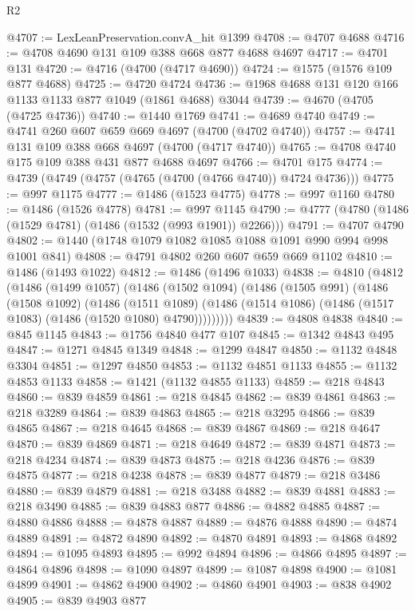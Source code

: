 \begin{lexlean}{R2}
\begin{coremodule}
@4707 := LexLeanPreservation.convA_hit @1399
@4708 := @4707 @4688
@4716 := @4708 @4690 @131 @109 @388 @668 @877 @4688 @4697
@4717 := @4701 @131
@4720 := @4716 (@4700 (@4717 @4690))
@4724 := @1575 (@1576 @109 @877 @4688)
@4725 := @4720 @4724
@4736 := @1968 @4688 @131 @120 @166 @1133 @1133 @877 @1049 (@1861 @4688) @3044
@4739 := @4670 (@4705 (@4725 @4736))
@4740 := @1440 @1769
@4741 := @4689 @4740
@4749 := @4741 @260 @607 @659 @669 @4697 (@4700 (@4702 @4740))
@4757 := @4741 @131 @109 @388 @668 @4697 (@4700 (@4717 @4740))
@4765 := @4708 @4740 @175 @109 @388 @431 @877 @4688 @4697
@4766 := @4701 @175
@4774 := @4739 (@4749 (@4757 (@4765 (@4700 (@4766 @4740)) @4724 @4736)))
@4775 := @997 @1175
@4777 := @1486 (@1523 @4775)
@4778 := @997 @1160
@4780 := @1486 (@1526 @4778)
@4781 := @997 @1145
@4790 := @4777 (@4780 (@1486 (@1529 @4781) (@1486 (@1532 (@993 @1901)) @2266)))
@4791 := @4707 @4790
@4802 := @1440 (@1748 @1079 @1082 @1085 @1088 @1091 @990 @994 @998 @1001 @841)
@4808 := @4791 @4802 @260 @607 @659 @669 @1102
@4810 := @1486 (@1493 @1022)
@4812 := @1486 (@1496 @1033)
@4838 := @4810
    (@4812
      (@1486
        (@1499 @1057)
        (@1486
          (@1502 @1094)
          (@1486
            (@1505 @991)
            (@1486
              (@1508 @1092)
              (@1486
                (@1511 @1089)
                (@1486 (@1514 @1086) (@1486 (@1517 @1083) (@1486 (@1520 @1080) @4790)))))))))
@4839 := @4808 @4838
@4840 := @845 @1145
@4843 := @1756 @4840 @477 @107
@4845 := @1342 @4843 @495
@4847 := @1271 @4845 @1349
@4848 := @1299 @4847
@4850 := @1132 @4848 @3304
@4851 := @1297 @4850
@4853 := @1132 @4851 @1133
@4855 := @1132 @4853 @1133
@4858 := @1421 (@1132 @4855 @1133)
@4859 := @218 @4843
@4860 := @839 @4859
@4861 := @218 @4845
@4862 := @839 @4861
@4863 := @218 @3289
@4864 := @839 @4863
@4865 := @218 @3295
@4866 := @839 @4865
@4867 := @218 @4645
@4868 := @839 @4867
@4869 := @218 @4647
@4870 := @839 @4869
@4871 := @218 @4649
@4872 := @839 @4871
@4873 := @218 @4234
@4874 := @839 @4873
@4875 := @218 @4236
@4876 := @839 @4875
@4877 := @218 @4238
@4878 := @839 @4877
@4879 := @218 @3486
@4880 := @839 @4879
@4881 := @218 @3488
@4882 := @839 @4881
@4883 := @218 @3490
@4885 := @839 @4883 @877
@4886 := @4882 @4885
@4887 := @4880 @4886
@4888 := @4878 @4887
@4889 := @4876 @4888
@4890 := @4874 @4889
@4891 := @4872 @4890
@4892 := @4870 @4891
@4893 := @4868 @4892
@4894 := @1095 @4893
@4895 := @992 @4894
@4896 := @4866 @4895
@4897 := @4864 @4896
@4898 := @1090 @4897
@4899 := @1087 @4898
@4900 := @1081 @4899
@4901 := @4862 @4900
@4902 := @4860 @4901
@4903 := @838 @4902
@4905 := @839 @4903 @877

\end{coremodule}
\end{lexlean}
